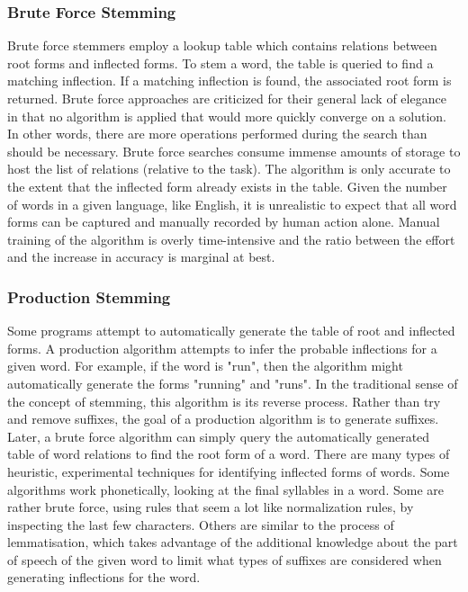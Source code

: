 \subsubsection{Brute Force Stemming}
Brute force stemmers employ a lookup table which contains relations between root forms and inflected forms. To stem a word, the table is queried to find a matching inflection. If a matching inflection is found, the associated root form is returned. Brute force approaches are criticized for their general lack of elegance in that no algorithm is applied that would more quickly converge on a solution. In other words, there are more operations performed during the search than should be necessary. Brute force searches consume immense amounts of storage to host the list of relations (relative to the task). The algorithm is only accurate to the extent that the inflected form already exists in the table. Given the number of words in a given language, like English, it is unrealistic to expect that all word forms can be captured and manually recorded by human action alone. Manual training of the algorithm is overly time-intensive and the ratio between the effort and the increase in accuracy is marginal at best.

\subsubsection{Production Stemming}
Some programs attempt to automatically generate the table of root and inflected forms. A production algorithm attempts to infer the probable inflections for a given word. For example, if the word is "run", then the algorithm might automatically generate the forms "running" and "runs". In the traditional sense of the concept of stemming, this algorithm is its reverse process. Rather than try and remove suffixes, the goal of a production algorithm is to generate suffixes. Later, a brute force algorithm can simply query the automatically generated table of word relations to find the root form of a word.
There are many types of heuristic, experimental techniques for identifying inflected forms of words. Some algorithms work phonetically, looking at the final syllables in a word. Some are rather brute force, using rules that seem a lot like normalization rules, by inspecting the last few characters. Others are similar to the process of lemmatisation, which takes advantage of the additional knowledge about the part of speech of the given word to limit what types of suffixes are considered when generating inflections for the word.

